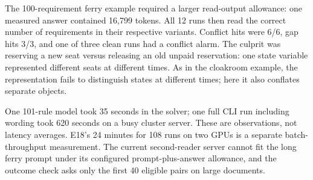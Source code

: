 The 100-requirement ferry example required a larger read-output allowance:
one measured answer contained 16,799 tokens. All 12 runs then read the correct
number of requirements in their respective variants. Conflict hits were 6/6,
gap hits 3/3, and one of three clean runs had a conflict alarm. The culprit was
reserving a new seat versus releasing an old unpaid reservation: one state
variable represented different seats at different times. As in the cloakroom
example, the representation fails to distinguish states at different times;
here it also conflates separate objects.

One 101-rule model took 35 seconds in the solver; one full CLI run including
wording took 620 seconds on a busy cluster server. These are observations,
not latency averages. E18's 24 minutes for 108 runs on two GPUs is a separate
batch-throughput measurement. The current second-reader server cannot fit the
long ferry prompt under its configured prompt-plus-answer allowance, and the
outcome check asks only the first 40 eligible pairs on large documents.


